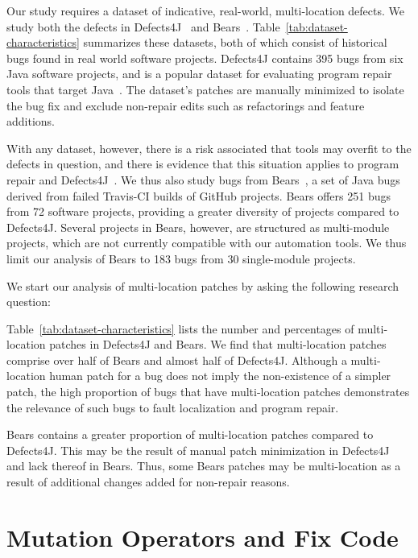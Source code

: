 \documentclass[sigconf, timestamp-false, anonymous=true]{acmart}
\begin{document}
Our study requires a dataset of indicative, real-world,
multi-location defects.  We study both the defects in
Defects4J~\cite{defects4j} and Bears~\cite{bears}.  Table~\ref{tab:dataset-characteristics}
summarizes these datasets, both of which
consist of historical
bugs found in real world software projects. Defects4J contains 395 bugs from 
six Java software projects, and is a popular dataset for evaluating 
program repair tools that target Java~\cite{durieux-repair-them-all}.
The dataset's patches are manually minimized to isolate the bug fix 
and exclude non-repair edits such as refactorings and feature additions.

With any dataset, however, there is a risk associated that tools may overfit
to the defects in question, and there is evidence that this situation applies to
program repair and Defects4J~\cite{durieux-repair-them-all}. 
We thus also study bugs from Bears~\cite{bears}, 
a set of Java bugs derived from failed Travis-CI builds of GitHub projects. 
Bears offers 251 bugs from 72 software projects, providing a greater diversity of 
projects compared to Defects4J. 
Several projects in Bears, however, are structured as multi-module projects, 
which are not currently compatible with our automation tools.
We thus limit our analysis of Bears to 183 bugs from 30 single-module projects.


We start our analysis of multi-location patches by asking the following research question:

Table~\ref{tab:dataset-characteristics} lists the number and percentages of
multi-location patches in Defects4J and Bears. 
We find that multi-location patches comprise over half of Bears and almost half of Defects4J.
Although a multi-location human patch for a bug does not imply the 
non-existence of a simpler patch, the high proportion of bugs that have 
multi-location patches demonstrates the relevance of such bugs to fault localization and
program repair. 

Bears contains a greater proportion of 
multi-location patches compared to Defects4J. This may be the 
result of manual patch minimization in Defects4J~\cite{defects4j} 
and lack thereof in Bears.
Thus, some Bears patches may be multi-location as a result of additional 
changes added for non-repair reasons.






\section{Mutation Operators and Fix Code}
\label{sec:mutops}
\end{document}
